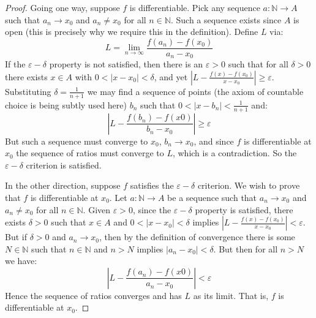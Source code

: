 \documentclass{article}
\theoremstyle{normal}
\begin{document}
        \begin{proof}
            Going one way, suppose $f$ is differentiable. Pick any
            sequence $a:\mathbb{N}\rightarrow{A}$ such that
            $a_{n}\rightarrow{x}_{0}$ and $a_{n}\ne{x}_{0}$ for all
            $n\in\mathbb{N}$. Such a sequence exists since $A$ is open
            (this is precisely why we require this in the definition).
            Define $L$ via:
            \begin{equation}
                L=
                \lim_{n\rightarrow\infty}
                \frac{f(a_{n})-f(x_{0})}{a_{n}-x_{0}}
            \end{equation}
            If the $\varepsilon-\delta$ property is not satisfied,
            then there is an $\varepsilon>0$ such that for all $\delta>0$
            there exists $x\in{A}$ with $0<|x-x_{0}|<\delta$, and yet
            $\left|L-\frac{f(x)-f(x_{0})}{x-x_{0}}\right|\geq\varepsilon$.
            Substituting $\delta=\frac{1}{n+1}$ we may find a sequence of
            points (the axiom of countable choice is being subtly used here)
            $b_{n}$ such that $0<|x-b_{n}|<\frac{1}{n+1}$ and:
            \begin{equation}
                \left|
                    L-\frac{f(b_{n})-f(x{0})}{b_{n}-x_{0}}
                \right|
                \geq\varepsilon
            \end{equation}
            But such a sequence must converge to $x_{0}$,
            $b_{n}\rightarrow{x}_{0}$, and since $f$ is differentiable at
            $x_{0}$ the sequence of ratios must converge to $L$, which is a
            contradiction. So the $\varepsilon-\delta$ criterion is satisfied.
            \par\hfill\par
            In the other direction, suppose $f$ satisfies the
            $\varepsilon-\delta$ criterion. We wish to prove that $f$ is
            differentiable at $x_{0}$. Let $a:\mathbb{N}\rightarrow{A}$ be
            a sequence such that $a_{n}\rightarrow{x}_{0}$ and
            $a_{n}\ne{x}_{0}$ for all $n\in\mathbb{N}$. Given
            $\varepsilon>0$, since the $\varepsilon-\delta$ property is
            satisfied, there exists $\delta>0$ such that
            $x\in{A}$ and $0<|x-x_{0}|<\delta$ implies
            $\left|L-\frac{f(x)-f(x_{0})}{x-x_{0}}\right|<\varepsilon$.
            But if $\delta>0$ and $a_{n}\rightarrow{x}_{0}$, then by the
            definition of convergence there is some $N\in\mathbb{N}$ such
            that $n\in\mathbb{N}$ and $n>N$ implies
            $|a_{n}-x_{0}|<\delta$. But then for all $n>N$ we have:
            \begin{equation}
                \left|
                    L-\frac{f(a_{n})-f(x{0})}{a_{n}-x_{0}}
                \right|<\varepsilon
            \end{equation}
            Hence the sequence of ratios converges and has $L$ as its limit.
            That is, $f$ is differentiable at $x_{0}$.
        \end{proof}
\end{document}
